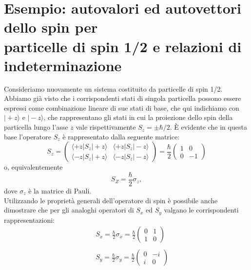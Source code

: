 \documentclass[a4paper,12pt,oneside]{book}
\begin{document}
\section[Esempio: autovalori ed autovettori dello spin per particelle di spin 1/2 e relazioni di indeterminazione]{Esempio: autovalori ed autovettori dello spin per\\ particelle di spin 1/2 e relazioni di indeterminazione}
Consideriamo nuovamente un sistema costituito da particelle di spin 1/2. Abbiamo già visto che i corrispondenti stati di singola particella possono essere espressi come combinazione lineare di sue stati di base, che qui indichiamo con $\vert +z\rangle $ e $\vert - z \rangle$, che rappresentano gli stati in cui la proiezione dello spin della particella lungo l'asse $z$ vale rispettivamente $S_z = \pm \hbar /2$. È evidente che in questa base l'operatore $S_z$ è rappresentato dalla seguente matrice:
\begin{equation}
S_z = \left( 
\begin{array}{cc}
\langle +z \vert S_z \vert +z \rangle &  \langle +z \vert S_z \vert -z \rangle \\
\langle -z \vert S_z \vert +z \rangle & \langle -z \vert S_z \vert -z \rangle  
\end{array}
\right)= \frac{\hbar}{2}\begin{pmatrix}
1 & 0 \\
0 & -1
\end{pmatrix}
\end{equation}
o, equivalentemente
\begin{equation}
S_Z =\frac{\hbar}{2}\sigma _z,
\end{equation}
dove $\sigma _z$ è la matrice di Pauli.\\
Utilizzando le proprietà generali dell'operatore di spin è possibile anche dimostrare che per gli analoghi operatori di $S_x$ ed $S_y$ valgano le corrispondenti rappresentazioni:
\begin{eqnarray}
& &\displaystyle{S_x = \frac{\hbar}{2}\sigma _x= \frac{\hbar}{2}\begin{pmatrix}
0 & 1 \\
1 & 0
\end{pmatrix}
} \\
\nonumber \\
& &\displaystyle{S_y= \frac{\hbar}{2}\sigma _y = \frac{\hbar}{2} \begin{pmatrix}
0 & -i \\
i & 0
\end{pmatrix}}
\end{eqnarray}
\end{document}
